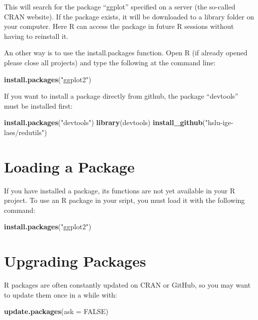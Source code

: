 \documentclass[
]{book}
\newenvironment{Shaded}{\begin{snugshade}}{\end{snugshade}}
\newcommand{\DataTypeTok}[1]{\textcolor[rgb]{0.13,0.29,0.53}{#1}}
\newcommand{\KeywordTok}[1]{\textcolor[rgb]{0.13,0.29,0.53}{\textbf{#1}}}
\newcommand{\NormalTok}[1]{#1}
\newcommand{\OtherTok}[1]{\textcolor[rgb]{0.56,0.35,0.01}{#1}}
\newcommand{\StringTok}[1]{\textcolor[rgb]{0.31,0.60,0.02}{#1}}
\let\oldShaded\Shaded
\let\endoldShaded\endShaded
\renewenvironment{Shaded}{\footnotesize\oldShaded}{\endoldShaded}
\begin{document}
This will search for the package ``ggplot'' specified on a server (the so-called CRAN website). If the package exists, it will be downloaded to a library folder on your computer. Here R can access the package in future R sessions without having to reinstall it.

An other way is to use the install.packages function.
Open R (if already opened please close all projects) and type the following at the command line:

\begin{Shaded}
\begin{Highlighting}[]
\KeywordTok{install.packages}\NormalTok{(}\StringTok{"ggplot2"}\NormalTok{)}
\end{Highlighting}
\end{Shaded}

If you want to install a package directly from github, the package ``devtools'' must be installed first:

\begin{Shaded}
\begin{Highlighting}[]
\KeywordTok{install.packages}\NormalTok{(}\StringTok{"devtools"}\NormalTok{)}
\KeywordTok{library}\NormalTok{(devtools)}
\KeywordTok{install_github}\NormalTok{(}\StringTok{"hslu-ige-laes/redutils"}\NormalTok{)}
\end{Highlighting}
\end{Shaded}

\hypertarget{loading-a-package}{%
\section{Loading a Package}\label{loading-a-package}}

If you have installed a package, its functions are not yet available in your R project. To use an R package in your sript, you must load it with the following command:

\begin{Shaded}
\begin{Highlighting}[]
\KeywordTok{install.packages}\NormalTok{(}\StringTok{"ggplot2"}\NormalTok{)}
\end{Highlighting}
\end{Shaded}

\hypertarget{upgrading-packages}{%
\section{Upgrading Packages}\label{upgrading-packages}}

R packages are often constantly updated on CRAN or GitHub, so you may want to update them once in a while with:

\begin{Shaded}
\begin{Highlighting}[]
\KeywordTok{update.packages}\NormalTok{(}\DataTypeTok{ask =} \OtherTok{FALSE}\NormalTok{)}
\end{Highlighting}
\end{Shaded}
\end{document}
